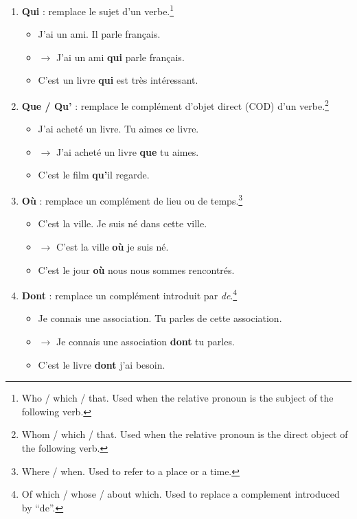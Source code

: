 \documentclass[math,code]{amznotes}
\theoremstyle{remark}
\begin{document}
\begin{enumerate}
    \item \textbf{Qui} : remplace le sujet d'un verbe.\footnote{Who / which / that. Used when the relative pronoun is the subject of the following verb.}
    \begin{itemize}
        \item J'ai un ami. Il parle français.
        \item $\rightarrow$ J'ai un ami \textbf{qui} parle français.
        \item C'est un livre \textbf{qui} est très intéressant.
    \end{itemize}

    \item \textbf{Que / Qu'} : remplace le complément d'objet direct (COD) d'un verbe.\footnote{Whom / which / that. Used when the relative pronoun is the direct object of the following verb.}
    \begin{itemize}
        \item J'ai acheté un livre. Tu aimes ce livre.
        \item $\rightarrow$ J'ai acheté un livre \textbf{que} tu aimes.
        \item C'est le film \textbf{qu'}il regarde.
    \end{itemize}

    \item \textbf{Où} : remplace un complément de lieu ou de temps.\footnote{Where / when. Used to refer to a place or a time.}
    \begin{itemize}
        \item C'est la ville. Je suis né dans cette ville.
        \item $\rightarrow$ C'est la ville \textbf{où} je suis né.
        \item C'est le jour \textbf{où} nous nous sommes rencontrés.
    \end{itemize}

    \item \textbf{Dont} : remplace un complément introduit par \textit{de}.\footnote{Of which / whose / about which. Used to replace a complement introduced by ``de''.}
    \begin{itemize}
        \item Je connais une association. Tu parles de cette association.
        \item $\rightarrow$ Je connais une association \textbf{dont} tu parles.
        \item C'est le livre \textbf{dont} j'ai besoin.
    \end{itemize}
\end{enumerate}
\end{document}
